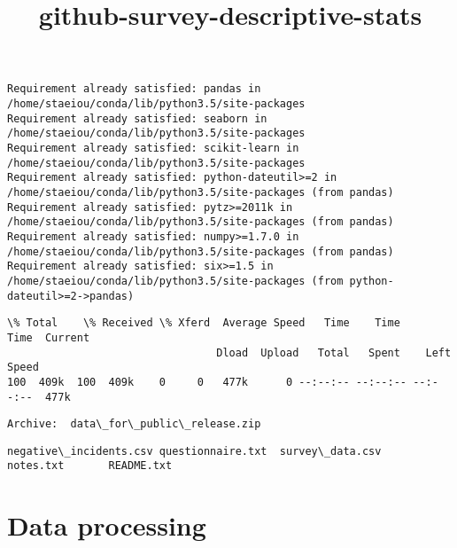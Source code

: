 \documentclass[11pt]{article}
\title{github-survey-descriptive-stats}
\begin{document}
    
    
    \maketitle
    
    

    
    


    \begin{Verbatim}[commandchars=\\\{\}]
Requirement already satisfied: pandas in /home/staeiou/conda/lib/python3.5/site-packages
Requirement already satisfied: seaborn in /home/staeiou/conda/lib/python3.5/site-packages
Requirement already satisfied: scikit-learn in /home/staeiou/conda/lib/python3.5/site-packages
Requirement already satisfied: python-dateutil>=2 in /home/staeiou/conda/lib/python3.5/site-packages (from pandas)
Requirement already satisfied: pytz>=2011k in /home/staeiou/conda/lib/python3.5/site-packages (from pandas)
Requirement already satisfied: numpy>=1.7.0 in /home/staeiou/conda/lib/python3.5/site-packages (from pandas)
Requirement already satisfied: six>=1.5 in /home/staeiou/conda/lib/python3.5/site-packages (from python-dateutil>=2->pandas)

    \end{Verbatim}




    \begin{Verbatim}[commandchars=\\\{\}]
  \% Total    \% Received \% Xferd  Average Speed   Time    Time     Time  Current
                                 Dload  Upload   Total   Spent    Left  Speed
100  409k  100  409k    0     0   477k      0 --:--:-- --:--:-- --:--:--  477k

    \end{Verbatim}


    \begin{Verbatim}[commandchars=\\\{\}]
Archive:  data\_for\_public\_release.zip

    \end{Verbatim}


    \begin{Verbatim}[commandchars=\\\{\}]
negative\_incidents.csv	questionnaire.txt  survey\_data.csv
notes.txt		README.txt

    \end{Verbatim}

    \section{Data processing}\label{data-processing}
\end{document}
